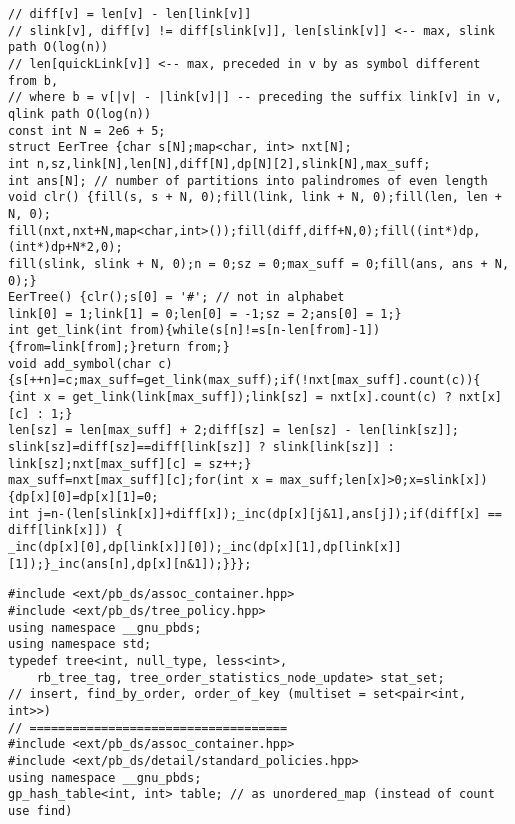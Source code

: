 \documentclass[12pt]{article}
\begin{document}
\begin{verbatim}
// diff[v] = len[v] - len[link[v]]
// slink[v], diff[v] != diff[slink[v]], len[slink[v]] <-- max, slink path O(log(n))
// len[quickLink[v]] <-- max, preceded in v by as symbol different from b,
// where b = v[|v| - |link[v]|] -- preceding the suffix link[v] in v, qlink path O(log(n))
const int N = 2e6 + 5;
struct EerTree {char s[N];map<char, int> nxt[N];
int n,sz,link[N],len[N],diff[N],dp[N][2],slink[N],max_suff;
int ans[N]; // number of partitions into palindromes of even length
void clr() {fill(s, s + N, 0);fill(link, link + N, 0);fill(len, len + N, 0);
fill(nxt,nxt+N,map<char,int>());fill(diff,diff+N,0);fill((int*)dp,(int*)dp+N*2,0);
fill(slink, slink + N, 0);n = 0;sz = 0;max_suff = 0;fill(ans, ans + N, 0);}
EerTree() {clr();s[0] = '#'; // not in alphabet
link[0] = 1;link[1] = 0;len[0] = -1;sz = 2;ans[0] = 1;}
int get_link(int from){while(s[n]!=s[n-len[from]-1]){from=link[from];}return from;}
void add_symbol(char c) {s[++n]=c;max_suff=get_link(max_suff);if(!nxt[max_suff].count(c)){
{int x = get_link(link[max_suff]);link[sz] = nxt[x].count(c) ? nxt[x][c] : 1;}
len[sz] = len[max_suff] + 2;diff[sz] = len[sz] - len[link[sz]];
slink[sz]=diff[sz]==diff[link[sz]] ? slink[link[sz]] : link[sz];nxt[max_suff][c] = sz++;}
max_suff=nxt[max_suff][c];for(int x = max_suff;len[x]>0;x=slink[x]){dp[x][0]=dp[x][1]=0;
int j=n-(len[slink[x]]+diff[x]);_inc(dp[x][j&1],ans[j]);if(diff[x] == diff[link[x]]) {
_inc(dp[x][0],dp[link[x]][0]);_inc(dp[x][1],dp[link[x]][1]);}_inc(ans[n],dp[x][n&1]);}}};
\end{verbatim}

\begin{verbatim}
#include <ext/pb_ds/assoc_container.hpp>
#include <ext/pb_ds/tree_policy.hpp>
using namespace __gnu_pbds;
using namespace std;
typedef tree<int, null_type, less<int>, 
    rb_tree_tag, tree_order_statistics_node_update> stat_set;
// insert, find_by_order, order_of_key (multiset = set<pair<int, int>>)
// ====================================
#include <ext/pb_ds/assoc_container.hpp>
#include <ext/pb_ds/detail/standard_policies.hpp>
using namespace __gnu_pbds;
gp_hash_table<int, int> table; // as unordered_map (instead of count use find)
\end{verbatim}
\end{document}
